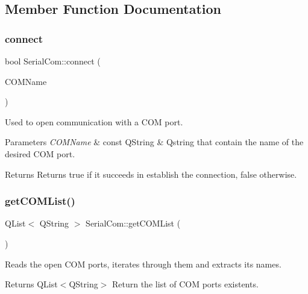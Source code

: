 \subsection{Member Function Documentation}
\mbox{\label{classSerialCom_a7a89d87e537831c46dccbd4f1c06d70c}} 
\subsubsection{\texorpdfstring{connect}{connect}}
{\footnotesize\ttfamily bool Serial\+Com\+::connect (\begin{DoxyParamCaption}\item[{const Q\+String \&}]{C\+O\+M\+Name }\end{DoxyParamCaption})\hspace{0.3cm}{\ttfamily [slot]}}



Used to open communication with a C\+OM port. 


\begin{DoxyParams}{Parameters}
{\em C\+O\+M\+Name} & const Q\+String \& Qstring that contain the name of the desired C\+OM port. \\
\hline
\end{DoxyParams}
\begin{DoxyReturn}{Returns}
Returns true if it succeeds in establish the connection, false otherwise. 
\end{DoxyReturn}
\mbox{\label{classSerialCom_ac9a5c3d791e3854e18f5cf36e1626d5f}} 
\subsubsection{\texorpdfstring{get\+C\+O\+M\+List()}{getCOMList()}}
{\footnotesize\ttfamily Q\+List$<$ Q\+String $>$ Serial\+Com\+::get\+C\+O\+M\+List (\begin{DoxyParamCaption}{ }\end{DoxyParamCaption})}



Reads the open C\+OM ports, iterates through them and extracts it\textquotesingle{}s names. 

\begin{DoxyReturn}{Returns}
Q\+List$<$\+Q\+String$>$ Return the list of C\+OM ports existents. 
\end{DoxyReturn}
\mbox{\label{classSerialCom_ad4ae114a9e7b76b958776799743dd8a5}} 

